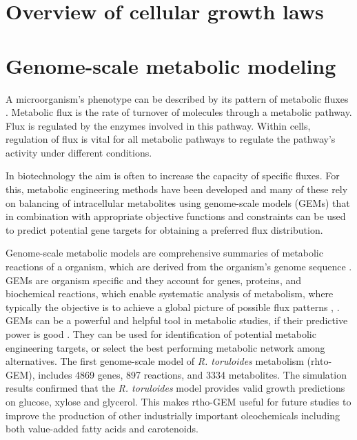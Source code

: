 

\section{Overview of cellular growth laws}

\section{Genome-scale metabolic modeling} %

A microorganism's phenotype can be described by its pattern of metabolic fluxes \cite{Kerkhoven2014}. Metabolic flux is the 
rate of turnover of molecules through a metabolic pathway. Flux is regulated by the enzymes involved in this pathway. Within cells, 
regulation of flux is vital for all metabolic pathways to regulate the pathway's activity under different conditions. \cite{Voet1995}

In biotechnology the aim is often to increase the capacity of specific fluxes. 
For this, metabolic engineering methods have been developed and many of these 
rely on balancing of intracellular metabolites using genome-scale models (GEMs) that in
combination with appropriate objective functions and constraints can be used to predict potential gene 
targets for obtaining a preferred flux distribution. \cite{Kerkhoven2014} 

Genome-scale metabolic models are comprehensive summaries of metabolic reactions of a
organism, which are derived from the organism's genome sequence \cite{Tiukova2019}. GEMs are organism specific and they account for genes,
 proteins, and biochemical reactions, which enable systematic
analysis of metabolism, where typically
the objective is to achieve a global picture of possible flux
patterns \cite{Kerkhoven2014}, \cite{Chen2023}. GEMs can be a powerful and helpful tool in metabolic studies, if their predictive 
power is
good \cite{Rekena2023}. They can be used for identification of potential metabolic engineering targets, or select the best
performing metabolic network among alternatives.
The first genome-scale model of \textit{R. toruloides} metabolism (rhto-GEM), includes 4869 genes, 
897 reactions, and 3334
metabolites. The simulation results confirmed that the \textit{R. toruloides} model provides valid growth predictions on glucose, 
xylose and glycerol. This makes rtho-GEM useful for future studies to improve the production of other
industrially important oleochemicals including both value-added fatty acids and carotenoids. \cite{Tiukova2019}

